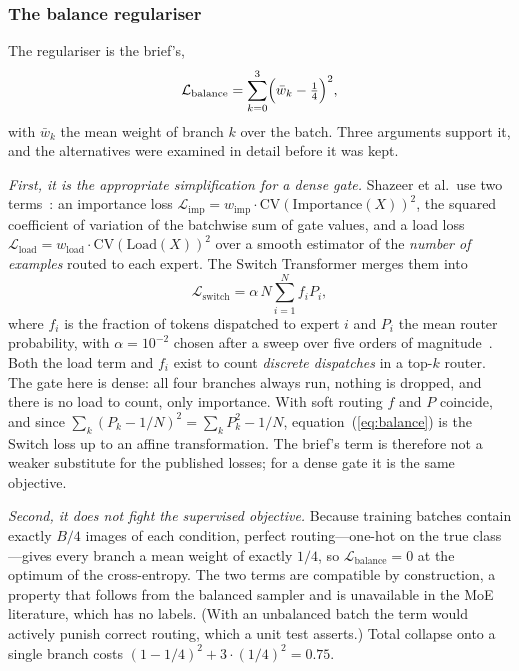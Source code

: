 \documentclass[conference]{IEEEtran}
\begin{document}
\subsubsection{The balance regulariser}

The regulariser is the brief's,
\begin{equation}
  \mathcal{L}_\text{balance} = \sum_{k=0}^{3} \Bigl( \bar{w}_k - \tfrac{1}{4} \Bigr)^2,
  \label{eq:balance}
\end{equation}
with $\bar{w}_k$ the mean weight of branch $k$ over the batch. Three arguments
support it, and the alternatives were examined in detail before it was kept.

\emph{First, it is the appropriate simplification for a dense gate.} Shazeer et
al.\ use two terms~\cite{shazeer2017outrageously}: an importance loss
$\mathcal{L}_\text{imp} = w_\text{imp} \cdot \mathrm{CV}(\mathrm{Importance}(X))^2$,
the squared coefficient of variation of the batchwise sum of gate values, and a
load loss $\mathcal{L}_\text{load} = w_\text{load} \cdot \mathrm{CV}(\mathrm{Load}(X))^2$
over a smooth estimator of the \emph{number of examples} routed to each expert.
The Switch Transformer merges them into
\begin{equation}
  \mathcal{L}_\text{switch} = \alpha\,N \sum_{i=1}^{N} f_i P_i,
  \label{eq:switch}
\end{equation}
where $f_i$ is the fraction of tokens dispatched to expert $i$ and $P_i$ the mean
router probability, with $\alpha = 10^{-2}$ chosen after a sweep over five orders
of magnitude~\cite{fedus2022switch,lepikhin2021gshard}. Both the load term and
$f_i$ exist to count \emph{discrete dispatches} in a top-$k$ router. The gate
here is dense: all four branches always run, nothing is dropped, and there is no
load to count, only importance. With soft routing $f$ and $P$ coincide, and since
$\sum_k (P_k - 1/N)^2 = \sum_k P_k^2 - 1/N$, equation~(\ref{eq:balance}) is the
Switch loss up to an affine transformation. The brief's term is therefore not a
weaker substitute for the published losses; for a dense gate it is the same
objective.

\emph{Second, it does not fight the supervised objective.} Because training
batches contain exactly $B/4$ images of each condition, perfect routing---one-hot
on the true class---gives every branch a mean weight of exactly $1/4$, so
$\mathcal{L}_\text{balance} = 0$ at the optimum of the cross-entropy. The two
terms are compatible by construction, a property that follows from the balanced
sampler and is unavailable in the MoE literature, which has no labels. (With an
unbalanced batch the term would actively punish correct routing, which a unit
test asserts.) Total collapse onto a single branch costs
$(1 - 1/4)^2 + 3 \cdot (1/4)^2 = 0.75$.
\end{document}
